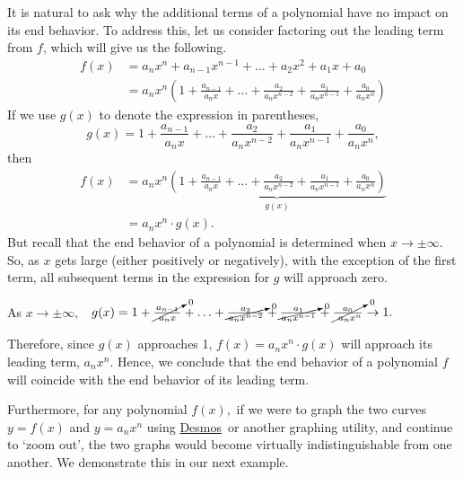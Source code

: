 \documentclass[12pt]{book}
\theoremstyle{definition}
\newcommand{\Desmos}{\href{https://www.desmos.com/}{Desmos}}
\begin{document}
It is natural to ask why the additional terms of a polynomial have no impact on its end behavior.  To address this, let us consider factoring out the leading term from $f$, which will give us the following.
\begin{equation*}
\begin{split}
f(x) & = a_{n}x^{n} + a_{n-1}x^{n-1}+ ... + a_{2}x^2 + a_{1}x + a_{0}\\
 & = a_{n} x^{n} \left( 1 + \frac{a_{n-1}}{a_{n} x}+ \ldots + \frac{a_{2}}{a_{n} x^{n-2}} + \frac{a_1}{a_{n} x^{n-1}}+\frac{a_{0}}{a_{n} x^{n}}\right)
\end{split}
\end{equation*}
If we use $g(x)$ to denote the expression in parentheses,
$$g(x)=1 + \frac{a_{n-1}}{a_{n} x}+ \ldots + \frac{a_{2}}{a_{n} x^{n-2}} + \frac{a_1}{a_{n} x^{n-1}}+\frac{a_{0}}{a_{n} x^{n}},$$
then
\begin{equation*}
\begin{split}
f(x) & = a_{n} x^{n} \underbrace{\left( 1 + \frac{a_{n-1}}{a_{n} x}+ \ldots + \frac{a_{2}}{a_{n} x^{n-2}} + \frac{a_1}{a_{n} x^{n-1}}+\frac{a_{0}}{a_{n} x^{n}}\right)}_{g(x)}\\
& = a_{n} x^{n} \cdot g(x).
\end{split}
\end{equation*}
But recall that the end behavior of a polynomial is determined when $x\rightarrow\pm\infty$.  So, as $x$ gets large (either positively or negatively), with the exception of the first term, all subsequent terms in the expression for $g$ will approach zero.
\begin{center}
As $x\rightarrow\pm\infty,$ \ $g(x)=1 + \cancelto{0}{\frac{a_{n-1}}{\ a_{n} x \ }}+ \ldots + \cancelto{0}{\frac{a_{2}}{a_{n} x^{n-2}}} + \cancelto{0}{\frac{a_1}{a_{n} x^{n-1}}}+\cancelto{0}{\frac{a_{0}}{\ a_{n} x^{n}}}\rightarrow 1.$
\end{center}
Therefore, since $g(x)$ approaches 1, $f(x)= a_{n} x^{n} \cdot g(x)$ will approach its leading term, $a_{n} x^{n}$.  Hence, we conclude that the end behavior of a polynomial $f$ will coincide with the end behavior of its leading term.
\par
Furthermore, for any polynomial $f(x),$ if we were to graph the two curves $y=f(x)$ and $y=a_nx^n$ using \Desmos \ or another graphing utility, and continue to `zoom out', the two graphs would become virtually indistinguishable from one another.  We demonstrate this in our next example.
\end{document}
